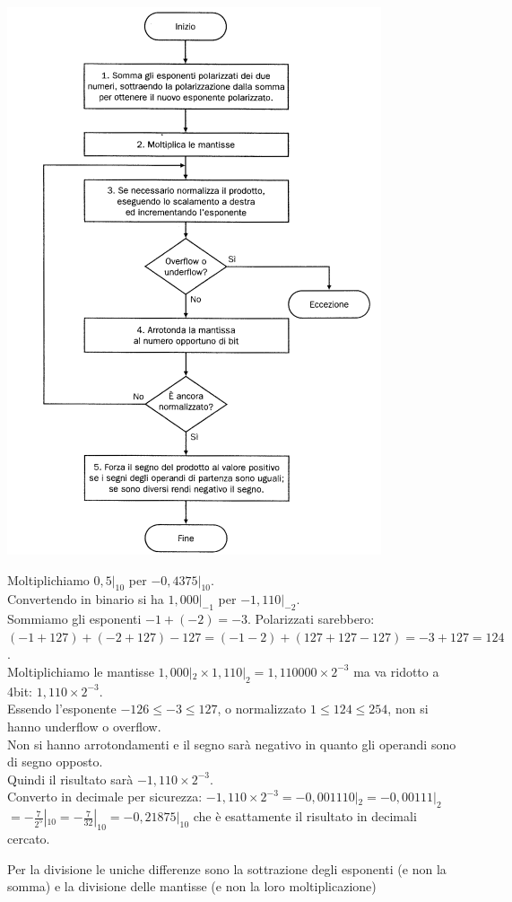 \documentclass[a4paper,12pt, oneside]{book}
\begin{document}
\begin{center}
  \includegraphics[scale = 0.9]{img/mul.png}
\end{center}
\newpage
\begin{esempio}
  Moltiplichiamo $0,5|_{10}$ per $-0,4375|_{10}$.\\
  Convertendo in binario si ha  $1,000|_{-1}$ per $-1,110|_{-2}$.\\
  Sommiamo gli esponenti $-1 + (-2) = -3$. Polarizzati sarebbero: $(-1+127) + (-2+127)-127 = (-1-2) + (127+127-127) = -3 +127 = 124$.\\
  Moltiplichiamo le mantisse $1,000|_2 \times 1,110|_2 = 1,110000 \times 2^{-3}$ ma va ridotto a 4bit: $1,110 \times 2^{-3}$.\\
  Essendo l'esponente $-126\leq -3\leq 127$, o normalizzato $1\leq 124\leq 254$,
  non si hanno underflow o overflow.\\
  Non si hanno arrotondamenti e il segno sarà negativo in quanto gli operandi sono di segno opposto.\\
  Quindi il risultato sarà $-1,110\times 2^{-3}$.\\
  Converto in decimale per sicurezza: $-1,110\times 2^{-3}= -0,001110|_2=-0,00111|_2$\\
  $=- \frac{7}{2^5}|_{10}=-\frac{7}{32}|_{10}=-0,21875|_{10}$ che è esattamente il risultato in decimali cercato.
\end{esempio}
Per la divisione le uniche differenze sono la sottrazione degli esponenti (e non la somma) e la divisione delle mantisse (e non la loro moltiplicazione)
\end{document}
